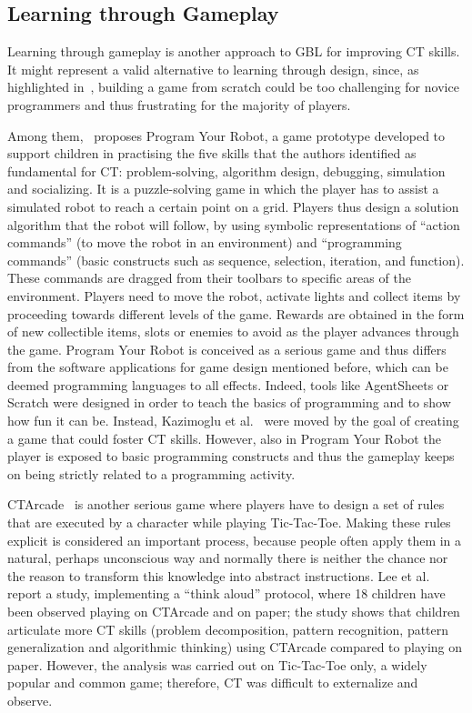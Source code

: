 \subsection{Learning through Gameplay}
Learning through gameplay is another approach to \ac{GBL} for improving \ac{CT} skills. It might represent a valid alternative to learning through design, since, as highlighted in~\cite{Lee:2014er}, building a game from scratch could be too challenging for novice programmers and thus frustrating for the majority of players.

Among them,~\cite{Kazimoglu:2012ft} proposes Program Your Robot, a game prototype developed to support children in practising the five skills that the authors identified as fundamental for \ac{CT}: problem-solving, algorithm design, debugging, simulation and socializing. It is a puzzle-solving game in which the player has to assist a simulated robot to reach a certain point on a grid. Players thus design a solution algorithm that the robot will follow, by using symbolic representations of ``action commands'' (to move the robot in an environment) and ``programming commands'' (basic constructs such as sequence, selection, iteration, and function). These commands are dragged from their toolbars to specific areas of the environment. Players need to move the robot, activate lights and collect items by proceeding towards different levels of the game. Rewards are obtained in the form of new collectible items, slots or enemies to avoid as the player advances through the game. Program Your Robot is conceived as a serious game and thus differs from the software applications for game design mentioned before, which can be deemed programming languages to all effects. Indeed, tools like AgentSheets or Scratch were designed in order to teach the basics of programming and to show how fun it can be. Instead, Kazimoglu et al.~\cite{Kazimoglu:2012ft} were moved by the goal of creating a game that could foster \ac{CT} skills.
However, also in Program Your Robot the player is exposed to basic programming constructs and thus the gameplay keeps on being strictly related to a programming activity. 

CTArcade~\cite{Lee:2014er} is another serious game where players have to design a set of rules that are executed by a character while playing Tic-Tac-Toe. Making these rules explicit is considered an important process, because people often apply them in a natural, perhaps unconscious way and normally there is neither the chance nor the reason to transform this knowledge into abstract instructions. Lee et al.~\cite{Lee:2014er} report a study, implementing a ``think aloud'' protocol, where 18 children have been observed playing on CTArcade and on paper; the study shows that children articulate more \ac{CT} skills (problem decomposition, pattern recognition, pattern generalization and algorithmic thinking) using CTArcade compared to playing on paper. However, the analysis was carried out on Tic-Tac-Toe only, a widely popular and common game; therefore, \ac{CT} was difficult to externalize and observe.


